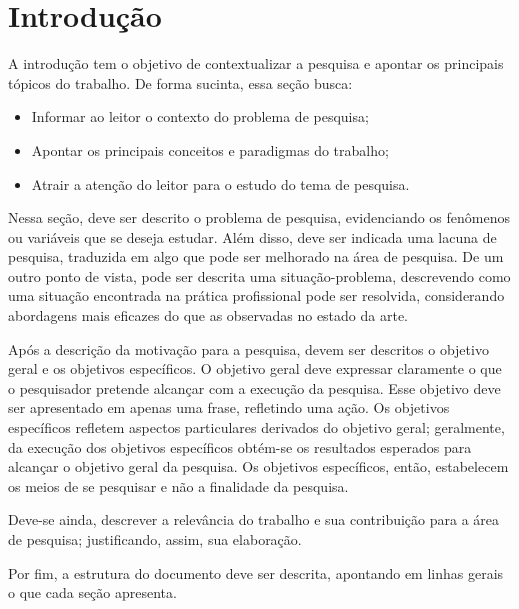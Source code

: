 \documentclass[
	article,			%
	11pt,				%
	oneside,			%
	a4paper,			%
	english,			%
	brazil,				%
	sumario=tradicional
	]{abntex2}
\begin{document}

\textual

\section{Introdução}
A introdução tem o objetivo de contextualizar a pesquisa e apontar os principais tópicos do trabalho. De forma sucinta, essa seção busca:

\begin{itemize}
\item Informar ao leitor o contexto do problema de pesquisa;
\item Apontar os principais conceitos e paradigmas do trabalho;
\item Atrair a atenção do leitor para o estudo do tema de pesquisa.
\end{itemize}

Nessa seção, deve ser descrito o problema de pesquisa, evidenciando os fenômenos ou variáveis que se deseja estudar. Além disso, deve ser indicada uma lacuna de pesquisa, traduzida em algo que pode ser melhorado na área de pesquisa. De um outro ponto de vista, pode ser descrita uma situação-problema, descrevendo como uma situação encontrada na prática profissional pode ser resolvida, considerando abordagens mais eficazes do que as observadas no estado da arte.

Após a descrição da motivação para a pesquisa, devem ser descritos o objetivo geral e os objetivos específicos. O objetivo geral deve expressar claramente o que o pesquisador pretende alcançar com a execução da pesquisa. Esse objetivo deve ser apresentado em apenas uma frase, refletindo uma ação. Os objetivos específicos refletem aspectos particulares derivados do objetivo geral; geralmente, da execução dos objetivos específicos obtém-se os resultados esperados para alcançar o objetivo geral da pesquisa. Os objetivos específicos, então, estabelecem os meios de se pesquisar e não a finalidade da pesquisa.

Deve-se ainda, descrever a relevância do trabalho e sua contribuição para a área de pesquisa; justificando, assim, sua elaboração.

Por fim, a estrutura do documento deve ser descrita, apontando em linhas gerais o que cada seção apresenta.
\end{document}
